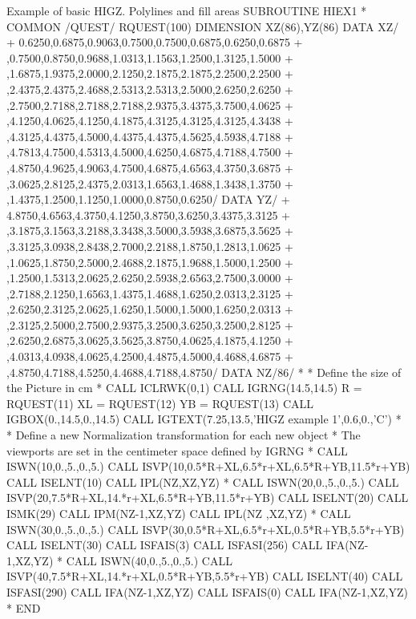 \newpage
\begin{XMPt}{Example of basic HIGZ. Polylines and fill areas}
\label{HIEX1}
      SUBROUTINE HIEX1
*
      COMMON /QUEST/ RQUEST(100)
      DIMENSION XZ(86),YZ(86)
      DATA XZ/
     +   0.6250,0.6875,0.9063,0.7500,0.7500,0.6875,0.6250,0.6875
     +  ,0.7500,0.8750,0.9688,1.0313,1.1563,1.2500,1.3125,1.5000
     +  ,1.6875,1.9375,2.0000,2.1250,2.1875,2.1875,2.2500,2.2500
     +  ,2.4375,2.4375,2.4688,2.5313,2.5313,2.5000,2.6250,2.6250
     +  ,2.7500,2.7188,2.7188,2.7188,2.9375,3.4375,3.7500,4.0625
     +  ,4.1250,4.0625,4.1250,4.1875,4.3125,4.3125,4.3125,4.3438
     +  ,4.3125,4.4375,4.5000,4.4375,4.4375,4.5625,4.5938,4.7188
     +  ,4.7813,4.7500,4.5313,4.5000,4.6250,4.6875,4.7188,4.7500
     +  ,4.8750,4.9625,4.9063,4.7500,4.6875,4.6563,4.3750,3.6875
     +  ,3.0625,2.8125,2.4375,2.0313,1.6563,1.4688,1.3438,1.3750
     +  ,1.4375,1.2500,1.1250,1.0000,0.8750,0.6250/
      DATA YZ/
     +   4.8750,4.6563,4.3750,4.1250,3.8750,3.6250,3.4375,3.3125
     +  ,3.1875,3.1563,3.2188,3.3438,3.5000,3.5938,3.6875,3.5625
     +  ,3.3125,3.0938,2.8438,2.7000,2.2188,1.8750,1.2813,1.0625
     +  ,1.0625,1.8750,2.5000,2.4688,2.1875,1.9688,1.5000,1.2500
     +  ,1.2500,1.5313,2.0625,2.6250,2.5938,2.6563,2.7500,3.0000
     +  ,2.7188,2.1250,1.6563,1.4375,1.4688,1.6250,2.0313,2.3125
     +  ,2.6250,2.3125,2.0625,1.6250,1.5000,1.5000,1.6250,2.0313
     +  ,2.3125,2.5000,2.7500,2.9375,3.2500,3.6250,3.2500,2.8125
     +  ,2.6250,2.6875,3.0625,3.5625,3.8750,4.0625,4.1875,4.1250
     +  ,4.0313,4.0938,4.0625,4.2500,4.4875,4.5000,4.4688,4.6875
     +  ,4.8750,4.7188,4.5250,4.4688,4.7188,4.8750/
      DATA NZ/86/
*
*          Define the size of the Picture in cm
*
      CALL ICLRWK(0,1)
      CALL IGRNG(14.5,14.5)
      R  = RQUEST(11)
      XL = RQUEST(12)
      YB = RQUEST(13)
      CALL IGBOX(0.,14.5,0.,14.5)
      CALL IGTEXT(7.25,13.5,'HIGZ example 1',0.6,0.,'C')
*
*          Define a new Normalization transformation for each new object
*          The viewports are set in the centimeter space defined by IGRNG
*
      CALL ISWN(10,0.,5.,0.,5.)
      CALL ISVP(10,0.5*R+XL,6.5*r+XL,6.5*R+YB,11.5*r+YB)
      CALL ISELNT(10)
      CALL IPL(NZ,XZ,YZ)
*
      CALL ISWN(20,0.,5.,0.,5.)
      CALL ISVP(20,7.5*R+XL,14.*r+XL,6.5*R+YB,11.5*r+YB)
      CALL ISELNT(20)
      CALL ISMK(29)
      CALL IPM(NZ-1,XZ,YZ)
      CALL IPL(NZ  ,XZ,YZ)
*
      CALL ISWN(30,0.,5.,0.,5.)
      CALL ISVP(30,0.5*R+XL,6.5*r+XL,0.5*R+YB,5.5*r+YB)
      CALL ISELNT(30)
      CALL ISFAIS(3)
      CALL ISFASI(256)
      CALL IFA(NZ-1,XZ,YZ)
*
      CALL ISWN(40,0.,5.,0.,5.)
      CALL ISVP(40,7.5*R+XL,14.*r+XL,0.5*R+YB,5.5*r+YB)
      CALL ISELNT(40)
      CALL ISFASI(290)
      CALL IFA(NZ-1,XZ,YZ)
      CALL ISFAIS(0)
      CALL IFA(NZ-1,XZ,YZ)
*
      END
\end{XMPt}
\newpage

